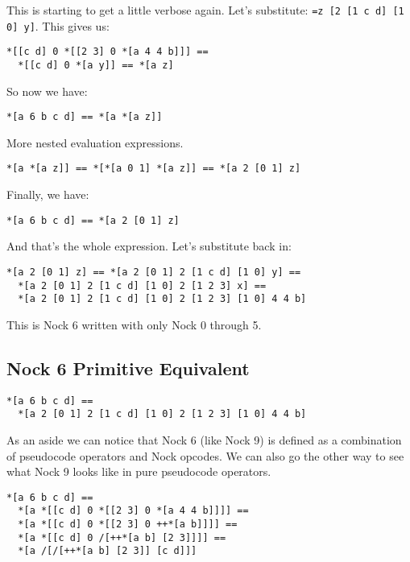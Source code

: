 \documentclass[twoside]{article}
\begin{document}
\noindent
This is starting to get a little verbose again. Let's substitute:
\lstinline[style=inlinecode]{=z [2 [1 c d] [1 0] y]}. This gives us:

\begin{lstlisting}[style=listingblock]
*[[c d] 0 *[[2 3] 0 *[a 4 4 b]]] ==
  *[[c d] 0 *[a y]] == *[a z]
\end{lstlisting}

\noindent
So now we have:

\begin{lstlisting}[style=listingblock]
*[a 6 b c d] == *[a *[a z]]
\end{lstlisting}

\noindent
More nested evaluation expressions.

\begin{lstlisting}[style=listingblock]
*[a *[a z]] == *[*[a 0 1] *[a z]] == *[a 2 [0 1] z]
\end{lstlisting}

\noindent
Finally, we have:

\begin{lstlisting}[style=listingblock]
*[a 6 b c d] == *[a 2 [0 1] z]
\end{lstlisting}

\noindent
And that's the whole expression. Let's substitute back in:

\begin{lstlisting}[style=listingblock]
*[a 2 [0 1] z] == *[a 2 [0 1] 2 [1 c d] [1 0] y] ==
  *[a 2 [0 1] 2 [1 c d] [1 0] 2 [1 2 3] x] ==
  *[a 2 [0 1] 2 [1 c d] [1 0] 2 [1 2 3] [1 0] 4 4 b]
\end{lstlisting}

\noindent
This is Nock 6 written with only Nock 0 through 5.

\subsection*{Nock 6 Primitive Equivalent}

\begin{lstlisting}[style=listingcode]
*[a 6 b c d] ==
  *[a 2 [0 1] 2 [1 c d] [1 0] 2 [1 2 3] [1 0] 4 4 b]
\end{lstlisting}

As an aside we can notice that Nock 6 (like Nock 9) is defined as a combination of pseudocode operators and Nock opcodes. We can also go the other way to see what Nock 9 looks like in pure pseudocode operators.

\begin{lstlisting}[style=listingblock]
*[a 6 b c d] ==
  *[a *[[c d] 0 *[[2 3] 0 *[a 4 4 b]]]] ==
  *[a *[[c d] 0 *[[2 3] 0 ++*[a b]]]] ==
  *[a *[[c d] 0 /[++*[a b] [2 3]]]] ==
  *[a /[/[++*[a b] [2 3]] [c d]]]
\end{lstlisting}
\end{document}
